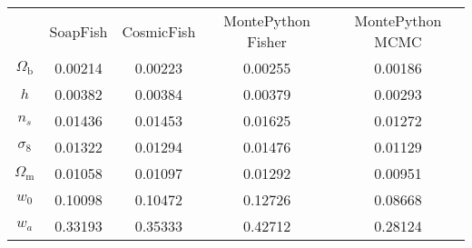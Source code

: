 \begin{table}
\centering
\begin{tabular}{|c|c|c|c|c|}
{} & {SoapFish} & {CosmicFish} & {MontePython Fisher} & {MontePython MCMC} \\
$\Omega_\mathrm{b}$ & 0.00214 & 0.00223 & 0.00255 & 0.00186 \\
$h$ & 0.00382 & 0.00384 & 0.00379 & 0.00293 \\
$n_s$ & 0.01436 & 0.01453 & 0.01625 & 0.01272 \\
$\sigma_8$ & 0.01322 & 0.01294 & 0.01476 & 0.01129 \\
$\Omega_\mathrm{m}$ & 0.01058 & 0.01097 & 0.01292 & 0.00951 \\
$w_0$ & 0.10098 & 0.10472 & 0.12726 & 0.08668 \\
$w_a$ & 0.33193 & 0.35333 & 0.42712 & 0.28124 \\
\end{tabular}
\end{table}
